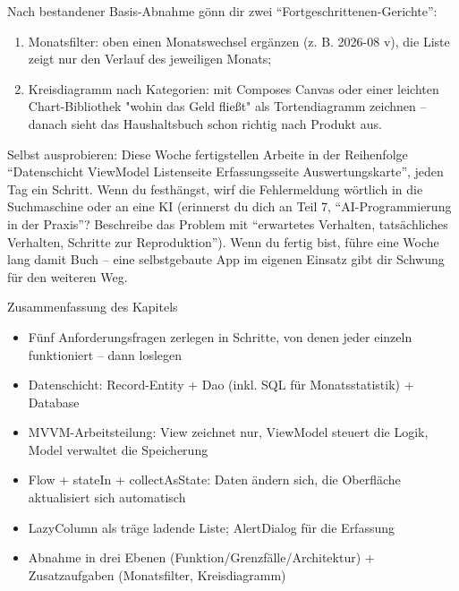 Nach bestandener Basis-Abnahme gönn dir zwei “Fortgeschrittenen-Gerichte”:

\begin{enumerate}
  \item Monatsfilter: oben einen Monatswechsel ergänzen (z. B. 2026-08 v), die Liste zeigt nur den Verlauf des jeweiligen Monats;
  \item Kreisdiagramm nach Kategorien: mit Composes Canvas oder einer leichten Chart-Bibliothek "wohin das Geld fließt" als Tortendiagramm zeichnen – danach sieht das Haushaltsbuch schon richtig nach Produkt aus.
\end{enumerate}

\begin{tcbpractice}{Selbst ausprobieren: Diese Woche fertigstellen}
Arbeite in der Reihenfolge “Datenschicht ViewModel Listenseite Erfassungsseite Auswertungskarte”, jeden Tag ein Schritt. Wenn du festhängst, wirf die Fehlermeldung wörtlich in die Suchmaschine oder an eine KI (erinnerst du dich an Teil 7, “AI-Programmierung in der Praxis”? Beschreibe das Problem mit “erwartetes Verhalten, tatsächliches Verhalten, Schritte zur Reproduktion”). Wenn du fertig bist, führe eine Woche lang damit Buch – eine selbstgebaute App im eigenen Einsatz gibt dir Schwung für den weiteren Weg.

\end{tcbpractice}

\begin{tcbsummary}{Zusammenfassung des Kapitels}
\begin{itemize}
  \item Fünf Anforderungsfragen zerlegen in Schritte, von denen jeder einzeln funktioniert – dann loslegen
  \item Datenschicht: Record-Entity + Dao (inkl. SQL für Monatsstatistik) + Database
  \item MVVM-Arbeitsteilung: View zeichnet nur, ViewModel steuert die Logik, Model verwaltet die Speicherung
  \item Flow + stateIn + collectAsState: Daten ändern sich, die Oberfläche aktualisiert sich automatisch
  \item LazyColumn als träge ladende Liste; AlertDialog für die Erfassung
  \item Abnahme in drei Ebenen (Funktion/Grenzfälle/Architektur) + Zusatzaufgaben (Monatsfilter, Kreisdiagramm)
\end{itemize}

\end{tcbsummary}
